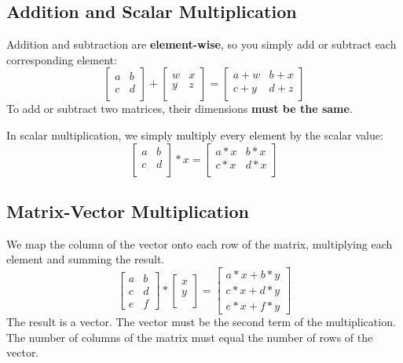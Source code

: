\subsection{Addition and Scalar Multiplication}
Addition and subtraction are {\bf element-wise}, so you simply add or subtract each corresponding element:
\[
\begin{bmatrix}  a & b \\   c & d \\  \end{bmatrix} +\begin{bmatrix}  w & x \\   y & z \\  \end{bmatrix} =\begin{bmatrix}  a+w & b+x \\   c+y & d+z \\ \end{bmatrix}
\]
To add or subtract two matrices, their dimensions {\bf must be the same}.

In scalar multiplication, we simply multiply every element by the scalar value:
\[
\begin{bmatrix}  a & b \\   c & d \\  \end{bmatrix} * x =\begin{bmatrix}  a*x & b*x \\   c*x & d*x \\ \end{bmatrix}
\]
\subsection{Matrix-Vector Multiplication}
We map the column of the vector onto each row of the matrix, multiplying each element and summing the result.
\[
\begin{bmatrix}  a & b \\   c & d \\   e & f \end{bmatrix} *\begin{bmatrix}  x \\   y \\  \end{bmatrix} =\begin{bmatrix}  a*x + b*y \\   c*x + d*y \\   e*x + f*y\end{bmatrix}
\]
The result is a vector. The vector must be the second term of the multiplication. The number of columns of the matrix must equal the number of rows of the vector.

